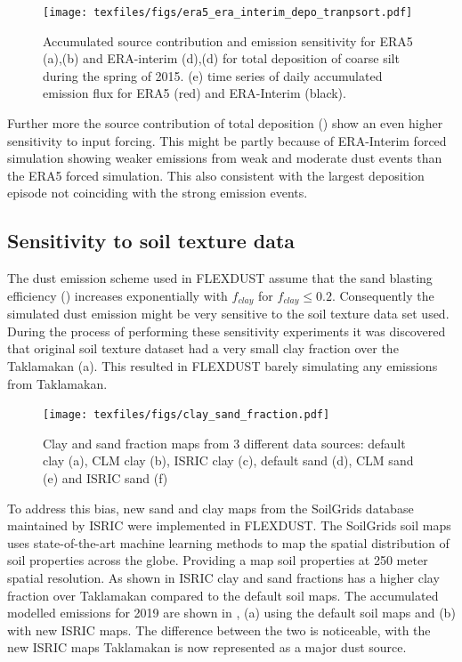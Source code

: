 \begin{figure}[htbp]
    \centering
    \texttt{[image: texfiles/figs/era5\_era\_interim\_depo\_tranpsort.pdf]}
    \caption{Accumulated source contribution and emission sensitivity for ERA5 (a),(b) and ERA-interim (d),(d) for total deposition of coarse silt during the spring of 2015. (e) time series of daily accumulated emission fl{}ux for ERA5 (red) and ERA-Interim (black).}
    \label{fig:era5_era_interim_source}
\end{figure}

Further more the source contribution of total deposition () show an even higher sensitivity to input forcing. This might be partly because of ERA-Interim forced simulation showing weaker emissions from weak and moderate dust events than the ERA5 forced simulation. 
This also consistent with the largest deposition episode not coinciding with the strong emission events.
\subsection{Sensitivity to soil texture data}\label{sec:sens_soil}
The dust emission scheme used in FLEXDUST assume that the sand blasting efficiency () increases exponentially with $f_{clay}$ for $f_{clay} \leq 0.2$. Consequently the simulated dust emission might be very sensitive to the soil texture data set used.
During the process of performing these sensitivity experiments it was discovered that original soil texture dataset had a very small clay fraction over the Taklamakan (a). This resulted in FLEXDUST barely simulating any emissions from Taklamakan.

\begin{figure}[hptb]
    \centering
    \texttt{[image: texfiles/figs/clay\_sand\_fraction.pdf]}
    \caption{Clay and sand fraction maps from 3 different data sources: default clay (a), CLM clay (b), ISRIC clay (c), default sand (d), CLM sand (e) and ISRIC sand (f)}
    \label{fig:clay_sand_fraction_comparison}
\end{figure}

To address this bias, new sand and clay maps from the SoilGrids database maintained by ISRIC were implemented in FLEXDUST. The SoilGrids soil maps uses state-of-the-art machine learning methods to map the spatial distribution of soil properties across the globe. Providing a map soil properties at 250 meter spatial resolution. As shown in  ISRIC clay and sand fractions has a higher clay fraction over Taklamakan compared to the default soil maps. The accumulated modelled emissions for 2019 are shown in , (a) using the default soil maps and (b) with new ISRIC maps. The difference between the two is noticeable, with the new ISRIC maps Taklamakan is now represented as a major dust source.

